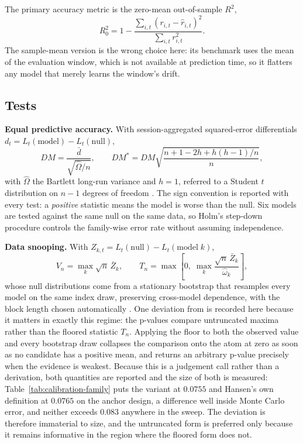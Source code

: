 \documentclass{article}
\theoremstyle{plain}
\theoremstyle{remark}
\begin{document}
The primary accuracy metric is the zero-mean out-of-sample $R^2$,
\begin{equation}
\label{eq:r2}
R^2_{0} = 1 - \frac{\sum_{i,t} (r_{i,t} - \hat r_{i,t})^2}{\sum_{i,t} r_{i,t}^2}.
\end{equation}
The sample-mean version is the wrong choice here: its benchmark uses the mean of
the evaluation window, which is not available at prediction time, so it flatters
any model that merely learns the window's drift.

\subsection{Tests}

\textbf{Equal predictive accuracy.} With session-aggregated squared-error
differentials $d_t = L_t(\mathrm{model}) - L_t(\mathrm{null})$,
\begin{equation}
\label{eq:dm}
DM = \frac{\bar d}{\sqrt{\hat\Omega / n}},
\qquad
DM^{\ast} = DM \sqrt{\frac{n + 1 - 2h + h(h-1)/n}{n}},
\end{equation}
with $\hat\Omega$ the Bartlett long-run variance and $h=1$, referred to a Student
$t$ distribution on $n-1$ degrees of freedom \citep{diebold1995,harvey1997}. The
sign convention is reported with every test: a \emph{positive} statistic means
the model is worse than the null. Six models are tested against the same null on
the same data, so Holm's step-down procedure \citep{holm1979} controls the
family-wise error rate without assuming independence.

\textbf{Data snooping.} With $Z_{k,t} = L_t(\mathrm{null}) - L_t(\mathrm{model}\;
k)$,
\begin{equation}
V_n = \max_k \sqrt{n}\, \bar Z_k,
\qquad
T_n = \max\!\left[ 0, \; \max_k \frac{\sqrt{n}\, \bar Z_k}{\hat\omega_k} \right],
\end{equation}
whose null distributions come from a stationary bootstrap that resamples every
model on the same index draw, preserving cross-model dependence, with the block
length chosen automatically \citep{white2000,hansen2005,politis1994,politis2004}.
One deviation from \citet{hansen2005} is recorded here because it matters in
exactly this regime: the p-values compare untruncated maxima rather than the
floored statistic $T_n$. Applying the floor to both the observed value and every
bootstrap draw collapses the comparison onto the atom at zero as soon as no
candidate has a positive mean, and returns an arbitrary p-value precisely when
the evidence is weakest. Because this is a judgement call rather than a
derivation, both quantities are reported and the size of both is measured:
Table~\ref{tab:calibration-family} puts the variant at $0.0755$ and Hansen's own
definition at $0.0765$ on the anchor design, a difference well inside Monte
Carlo error, and neither exceeds $0.083$ anywhere in the sweep. The deviation is
therefore immaterial to size, and the untruncated form is preferred only because
it remains informative in the region where the floored form does not.
\end{document}

